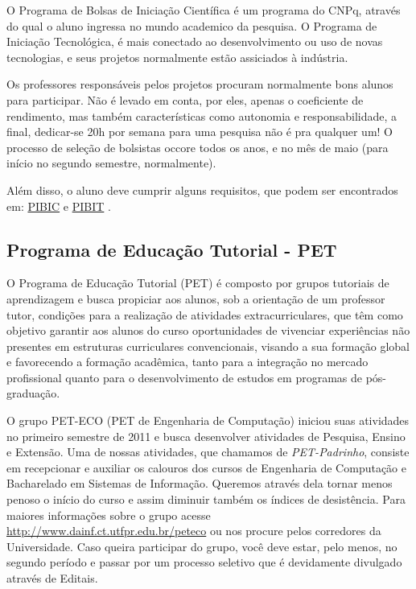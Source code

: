 \documentclass[a4paper,12pt,openany]{article}
\begin{document}
O Programa de Bolsas de Iniciação Científica é um programa do CNPq, através do qual o aluno ingressa no mundo academico da pesquisa. O Programa de Iniciação Tecnológica, é mais conectado ao desenvolvimento ou uso de novas tecnologias, e seus projetos normalmente estão assiciados à indústria.

Os professores responsáveis pelos projetos procuram normalmente bons alunos para participar. Não é levado em conta, por eles, apenas o coeficiente de rendimento, mas também características como autonomia e responsabilidade, a final, dedicar-se 20h por semana para uma pesquisa não é pra qualquer um! O processo de seleção de bolsistas occore todos os anos, e no mês de maio (para início no segundo semestre, normalmente).

Além disso, o aluno deve cumprir alguns requisitos, que podem ser encontrados em:  \href{http://www.utfpr.edu.br/pesquisa/bolsas/pibic-1}{PIBIC} e \href{http://www.utfpr.edu.br/pesquisa/bolsas/pibiti-1}{PIBIT} .


\subsection{Programa de Educação Tutorial - PET}

O Programa de Educação Tutorial (PET) é composto por grupos tutoriais de aprendizagem e busca propiciar aos alunos, sob a orientação de um professor tutor, condições para a realização de atividades extracurriculares, que têm como objetivo garantir aos alunos do curso oportunidades de vivenciar experiências não presentes em estruturas curriculares convencionais, visando a sua formação global e favorecendo a formação acadêmica, tanto para a integração no mercado profissional quanto para o desenvolvimento de estudos em programas de pós-graduação.

O grupo PET-ECO (PET de Engenharia de Computação) iniciou suas atividades no primeiro semestre de 2011 e busca desenvolver atividades de Pesquisa, Ensino e Extensão. Uma de nossas atividades, que chamamos de \textit{PET-Padrinho}, consiste em recepcionar e auxiliar os calouros dos cursos de Engenharia de Computação e Bacharelado em Sistemas de Informação. Queremos através dela tornar menos penoso o início do curso e assim diminuir também os índices de desistência. Para maiores informações sobre o grupo acesse \href{http://www.dainf.ct.utfpr.edu.br/peteco}{http://www.dainf.ct.utfpr.edu.br/peteco} ou nos procure pelos corredores da Universidade. Caso queira participar do grupo, você deve estar, pelo menos, no segundo período e passar por um processo seletivo que é devidamente divulgado através de Editais.
\end{document}
